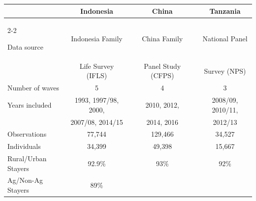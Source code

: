 \begin{tabular}{lccccc}
\toprule
                          & Indonesia            &  & China        &  & Tanzania          \\
                          \cline{2-2} \cline{4-4} \cline{6-6} 
                          \addlinespace

Data source               & Indonesia Family     &  & China Family &  & National Panel    \\
                          & Life Survey (IFLS)   &  & Panel Study (CFPS)  &  & Survey (NPS) \\
                          \addlinespace
Number of waves           & 5                    &  & 4            &  & 3                 \\
                          \addlinespace
Years included            & 1993, 1997/98, 2000, &  & 2010, 2012,  &  & 2008/09, 2010/11, \\
                          & 2007/08, 2014/15     &  & 2014, 2016   &  & 2012/13           \\ 
                          \addlinespace
Observations              & 77,744               &  & 129,466      &  & 34,527            \\
Individuals               & 34,399               &  & 49,398       &  & 15,667            \\
Rural/Urban Stayers & 92.9\%                 &  & 93\%         &  & 92\%              \\
Ag/Non-Ag Stayers  & 89\%                 &  &              &  &                   \\ 
\bottomrule
\end{tabular}
